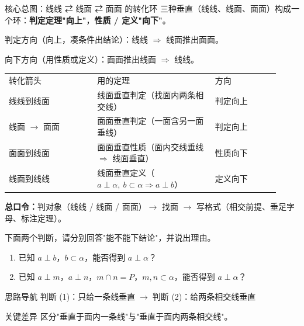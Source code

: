 \documentclass{exam-zh}
\begin{document}
\begin{eduSolutionBox}{核心总图：线线 ⇄ 线面 ⇄ 面面 的转化环}
  \begingroup
  \setlength{\parskip}{2.5mm}
三种垂直（线线、线面、面面）构成一个环：\textbf{判定定理"向上"}，\textbf{性质 / 定义"向下"}。\par
判定方向（向上，凑条件出结论）：线线 $\Rightarrow$ 线面推出面面。\par
向下方向（用性质或定义）：面面推出线面 $\Rightarrow$ 线线。\par
\begin{tabular}{p{0.30\linewidth}p{0.40\linewidth}p{0.22\linewidth}}
转化箭头 & 用的定理 & 方向\\
线线到线面 & 线面垂直判定（找面内两条相交线） & 判定向上\\
线面 $\to$ 面面 & 面面垂直判定（一面含另一面垂线） & 判定向上\\
面面到线面 & 面面垂直性质（面内交线垂线 $\Rightarrow$ 线面垂直） & 性质向下\\
线面到线线 & 线面垂直定义（$a\perp\alpha,\ b\subset\alpha\Rightarrow a\perp b$） & 定义向下
\end{tabular}
\par
\textbf{总口令：}判对象（线线 / 线面 / 面面）$\to$ 找面 $\to$ 写格式（相交前提、垂足字母、标注定理）。\par
  \endgroup
\end{eduSolutionBox}




\begin{eduProblemBlock}
下面两个判断，请分别回答"能不能下结论"，并说出理由。
\begin{enumerate}[label=(\arabic*)]
  \item 已知 $a\perp b$，$b\subset\alpha$，能否得到 $a\perp\alpha$？
  \item 已知 $a\perp m$，$a\perp n$，$m\cap n=P$，$m,n\subset\alpha$，能否得到 $a\perp\alpha$？
\end{enumerate}

\end{eduProblemBlock}





\begin{eduAuxItem}{思路导航}
判断 (1)：只给一条线垂直$\;\to\;$判断 (2)：给两条相交线垂直\end{eduAuxItem}




\begin{eduSubQuestionItem}{关键差异}
区分"垂直于面内一条线"与"垂直于面内两条相交线"。\end{eduSubQuestionItem}
\end{document}
